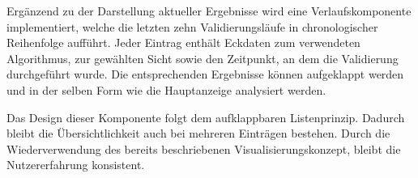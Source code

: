 Ergänzend zu der Darstellung aktueller Ergebnisse wird eine Verlaufskomponente implementiert, welche die letzten zehn Validierungsläufe in chronologischer Reihenfolge aufführt. Jeder Eintrag enthält Eckdaten zum verwendeten Algorithmus, zur gewählten Sicht sowie den Zeitpunkt, an dem die Validierung durchgeführt wurde. Die entsprechenden Ergebnisse können aufgeklappt werden und in der selben Form wie die Hauptanzeige analysiert werden.

Das Design dieser Komponente folgt dem aufklappbaren Listenprinzip. Dadurch bleibt die Übersichtlichkeit auch bei mehreren Einträgen bestehen. Durch die Wiederverwendung des bereits beschriebenen Visualisierungskonzept, bleibt die Nutzererfahrung konsistent.
